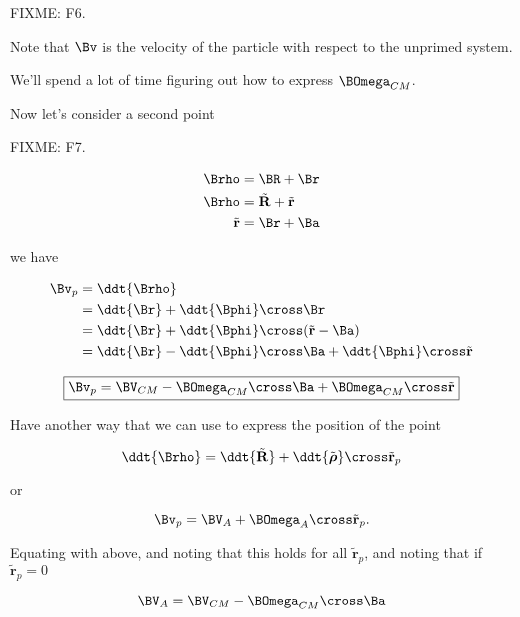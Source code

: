 FIXME: F6.

Note that $\Bv$ is the velocity of the particle with respect to the unprimed system.

We'll spend a lot of time figuring out how to express $\BOmega_{CM}$.

Now let's consider a second point

FIXME: F7.

\begin{align}\label{eqn:rigidBodyMotion:220}
\Brho &= \BR + \Br \\
\Brho &= \tilde{\mathbf{R}} + \tilde{\mathbf{r}} \\
\tilde{\mathbf{r}} &= \Br + \Ba
\end{align}

we have

\begin{align*}
\Bv_p
&=
\ddt{\Brho} \\
&= \ddt{\Br} + \ddt{\Bphi} \cross \Br \\
&= \ddt{\Br} + \ddt{\Bphi} \cross (\tilde{\mathbf{r}} - \Ba) \\
&= \ddt{\Br} - \ddt{\Bphi} \cross \Ba + \ddt{\Bphi} \cross \tilde{\mathbf{r}} 
\end{align*}

\begin{equation}\label{eqn:rigidBodyMotion:240}
\boxed{
\Bv_p = \BV_{CM} - 
\BOmega_{CM} \cross \Ba
+\BOmega_{CM} \cross \tilde{\mathbf{r}}
}
\end{equation}

Have another way that we can use to express the position of the point 

\begin{equation}\label{eqn:rigidBodyMotion:260}
\ddt{\Brho} 
= \ddt{\tilde{\mathbf{R}}} + \ddt{\tilde{\boldsymbol{\rho}}} \cross \tilde{\mathbf{r}}_p 
\end{equation}

or

\begin{equation}\label{eqn:rigidBodyMotion:280}
\Bv_p = \BV_A + \BOmega_A \cross \tilde{\mathbf{r}}_p.
\end{equation}

Equating with above, and noting that this holds for all $\tilde{\mathbf{r}}_p$, and noting that if $\tilde{\mathbf{r}}_p = 0$

\begin{equation}\label{eqn:rigidBodyMotion:300}
\BV_A = \BV_{CM} - \BOmega_{CM} \cross \Ba
\end{equation}

